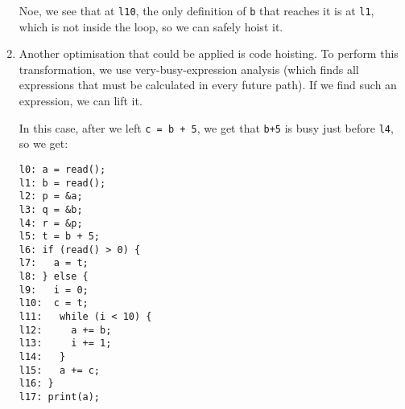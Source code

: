 \begin{enumerate}[label=(\alph*)]
Noe, we see that at \texttt{l10}, the only definition of \texttt{b} that reaches it is at \texttt{l1}, which is not inside the loop, so we can safely hoist it.

\item

  Another optimisation that could be applied is code hoisting. To perform this transformation, we use very-busy-expression analysis (which finds all expressions that must be calculated in every future path). If we find such an expression, we can lift it.

  In this case, after we left \texttt{c = b + 5}, we get that \texttt{b+5} is busy just before \texttt{l4}, so we get:

\begin{verbatim}
l0: a = read();          
l1: b = read();         
l2: p = &a;            
l3: q = &b;          
l4: r = &p;         
l5: t = b + 5;
l6: if (read() > 0) { 
l7:   a = t;     
l8: } else {
l9:   i = 0;        
l10:  c = t;   
l11:   while (i < 10) { 
l12:     a += b;     
l13:     i += 1;    
l14:   }
l15:   a += c;     
l16: }
l17: print(a);    
\end{verbatim}





        
    \end{enumerate}

